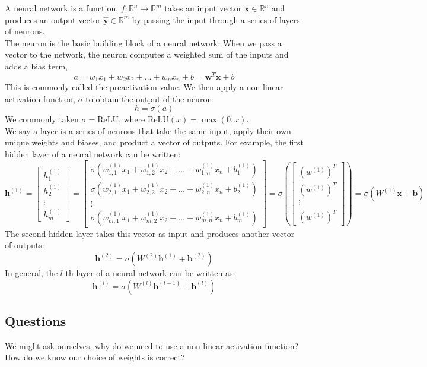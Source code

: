 \documentclass[10pt,a4paper]{article}
\begin{document}
\noindent
A neural network is a function, $f : \mathbb{R}^n \to \mathbb{R}^m$ takes an input vector $\mathbf{x} \in \mathbb{R}^n$ and produces an output vector $\hat{\mathbf{y}} \in \mathbb{R}^m$ by passing the input through a series of layers of neurons.  \\[1ex]
\noindent The neuron is the basic building block of a neural network. When we pass a vector to the network, the neuron computes a weighted sum of the inputs and adds a bias term,
$$a = w_1 x_1 + w_2 x_2 + \ldots + w_n x_n + b = \mathbf{w}^T \mathbf{x} + b$$
This is commonly called the preactivation value. We then apply a non linear activation function, $\sigma$ to obtain the output of the neuron:
$$h = \sigma(a)$$
We commonly taken $\sigma = \text{ReLU}$, where $\text{ReLU}(x) = \max(0, x)$. \\
We say a layer is  a series of neurons that take the same input, apply their own unique weights and biases, and product a vector of outputs. For example, the first hidden layer of a neural network can be written:
$$\mathbf{h}^{(1)} = \begin{bmatrix}
    h^{(1)}_1 \\
    h^{(1)}_2 \\
    \vdots \\
    h^{(1)}_m 
\end{bmatrix}
= 
\begin{bmatrix}
    \sigma(w^{(1)}_{1,1} x_1 + w^{(1)}_{1,2} x_2 + \ldots + w^{(1)}_{1,n} x_n + b^{(1)}_1) \\
    \sigma(w^{(1)}_{2,1} x_1 + w^{(1)}_{2,2} x_2 + \ldots + w^{(1)}_{2,n} x_n + b^{(1)}_2) \\
    \vdots \\
    \sigma(w^{(1)}_{m,1} x_1 + w^{(1)}_{m,2} x_2 + \ldots + w^{(1)}_{m,n} x_n + b^{(1)}_m)
\end{bmatrix}
= 
 \sigma \left(
\begin{bmatrix}
    (w^{(1)})^T\\
    (w^{(1)})^T\\
    \vdots \\
    (w^{(1)})^T
\end{bmatrix}
  \right)
  = 
\sigma(W^{(1)}\mathbf{x} + \mathbf{b})
$$
The second hidden layer takes this vector as input and produces another vector of outputs:
$$\mathbf{h}^{(2)} = \sigma(W^{(2)}\mathbf{h}^{(1)} + \mathbf{b}^{(2)})$$
In general, the $l$-th layer of a neural network can be written as:
$$\mathbf{h}^{(l)} = \sigma(W^{(l)}\mathbf{h}^{(l-1)} + \mathbf{b}^{(l)})$$
\subsection{Questions}
We might ask ourselves, why do we need to use a non linear activation function? How do we know our choice of weights is correct?
\end{document}
